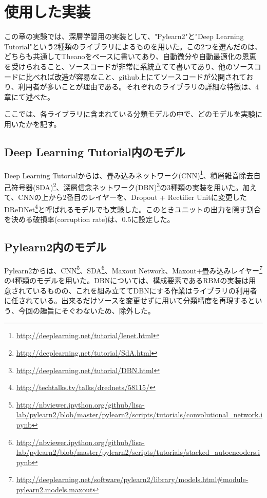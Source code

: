 \section{使用した実装}
この章の実験では、深層学習用の実装として、"Pylearn2"と"Deep Learning Tutorial"という2種類のライブラリによるものを用いた。この2つを選んだのは、どちらも共通してTheanoをベースに書いてあり、自動微分や自動最適化の恩恵を受けられること、ソースコードが非常に系統立てて書いてあり、他のソースコードに比べれば改造が容易なこと、github上にてソースコードが公開されており、利用者が多いことが理由である。それぞれのライブラリの詳細な特徴は、4章にて述べた。\par
ここでは、各ライブラリに含まれている分類モデルの中で、どのモデルを実験に用いたかを記す。

\subsection{Deep Learning Tutorial内のモデル}
Deep Learning Tutorialからは、畳み込みネットワーク(CNN)\footnote{\url{http://deeplearning.net/tutorial/lenet.html}}、積層雑音除去自己符号器(SDA)\footnote{\url{http://deeplearning.net/tutorial/SdA.html}}、深層信念ネットワーク(DBN)\footnote{\url{http://deeplearning.net/tutorial/DBN.html}}の3種類の実装を用いた。加えて、CNNの上から2番目のレイヤーを、Dropout + Rectifier Unitに変更したDReDNet\footnote{\url{http://techtalks.tv/talks/drednets/58115/}}と呼ばれるモデルでも実験した。このときユニットの出力を隠す割合を決める破損率(corruption rate)は、0.5に設定した。

\subsection{Pylearn2内のモデル}
Pylearn2からは、CNN\footnote{\url{http://nbviewer.ipython.org/github/lisa-lab/pylearn2/blob/master/pylearn2/scripts/tutorials/convolutional_network.ipynb}}、SDA\footnote{\url{http://nbviewer.ipython.org/github/lisa-lab/pylearn2/blob/master/pylearn2/scripts/tutorials/stacked_autoencoders.ipynb}}、Maxout Network、Maxout+畳み込みレイヤー\footnote{\url{http://deeplearning.net/software/pylearn2/library/models.html\#module-pylearn2.models.maxout}}の4種類のモデルを用いた。DBNについては、構成要素であるRBMの実装は用意されているものの、これを組み立ててDBNにする作業はライブラリの利用者に任されている。出来るだけソースを変更せずに用いて分類精度を再現するという、今回の趣旨にそぐわないため、除外した。

